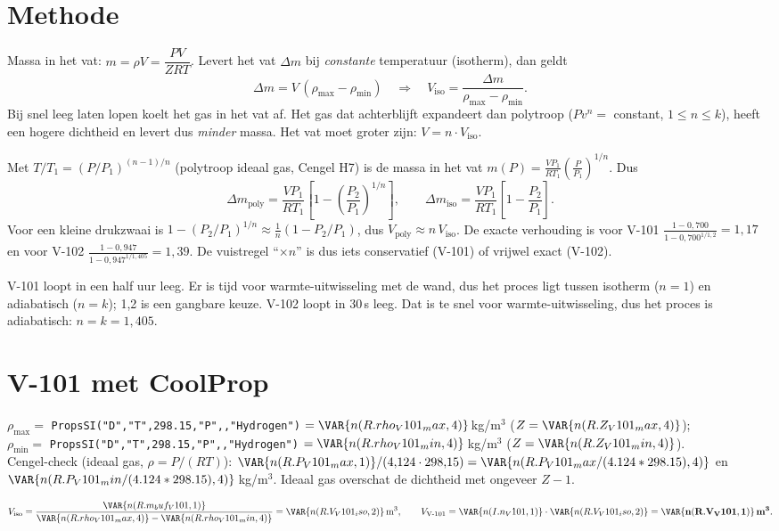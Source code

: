 \section{Methode}
\begin{methode}
Massa in het vat: $m = \rho V = \dfrac{P V}{Z R T}$. Levert het vat $\Delta m$ bij \emph{constante} temperatuur
(isotherm), dan geldt
\[
\Delta m = V\,(\rho_{\max}-\rho_{\min}) \quad\Rightarrow\quad V_\mathrm{iso} = \frac{\Delta m}{\rho_{\max}-\rho_{\min}}.
\]
Bij snel leeg laten lopen koelt het gas in het vat af. Het gas dat achterblijft expandeert dan polytroop
($P v^n = $ constant, $1 \le n \le k$), heeft een hogere dichtheid en levert dus \emph{minder} massa. Het vat moet
groter zijn: $V = n\cdot V_\mathrm{iso}$.
\end{methode}
Met $T/T_1 = (P/P_1)^{(n-1)/n}$ (polytroop ideaal gas, Cengel H7) is de massa in het vat
$m(P) = \frac{V P_1}{R T_1}\left(\frac{P}{P_1}\right)^{1/n}$. Dus
\[
\Delta m_\mathrm{poly} = \frac{V P_1}{R T_1}\left[1 - \left(\frac{P_2}{P_1}\right)^{1/n}\right],\qquad
\Delta m_\mathrm{iso} = \frac{V P_1}{R T_1}\left[1 - \frac{P_2}{P_1}\right].
\]
Voor een kleine drukzwaai is $1-(P_2/P_1)^{1/n} \approx \frac{1}{n}(1-P_2/P_1)$, dus $V_\mathrm{poly} \approx n\,V_\mathrm{iso}$.
De exacte verhouding is voor V-101 $\frac{1-0{,}700}{1-0{,}700^{1/1{,}2}} = 1{,}17$ en voor V-102
$\frac{1-0{,}947}{1-0{,}947^{1/1{,}405}} = 1{,}39$. De vuistregel ``$\times n$'' is dus iets conservatief (V-101)
of vrijwel exact (V-102).
\begin{waarom}[$n = 1{,}2$ voor V-101 en $n = k$ voor V-102]
V-101 loopt in een half uur leeg. Er is tijd voor warmte-uitwisseling met de wand, dus het proces ligt tussen
isotherm ($n=1$) en adiabatisch ($n=k$); 1,2 is een gangbare keuze. V-102 loopt in 30\,s leeg. Dat is te snel
voor warmte-uitwisseling, dus het proces is adiabatisch: $n = k = 1{,}405$.
\end{waarom}

\section{V-101 met CoolProp}
\begin{coolprop}
$\rho_{\max} = $ \texttt{PropsSI("D","T",298.15,"P",,"Hydrogen")} $= \VAR{n(R.rho_V101_max,4)}$\,kg/m$^3$
($Z = \VAR{n(R.Z_V101_max,4)}$);\\
$\rho_{\min} = $ \texttt{PropsSI("D","T",298.15,"P",,"Hydrogen")} $= \VAR{n(R.rho_V101_min,4)}$\,kg/m$^3$
($Z = \VAR{n(R.Z_V101_min,4)}$).\\
Cengel-check (ideaal gas, $\rho = P/(RT)$): $\VAR{n(R.P_V101_max,1)}/(4{,}124\cdot298{,}15) = \VAR{n(R.P_V101_max/(4.124*298.15),4)}$ en
$\VAR{n(R.P_V101_min/(4.124*298.15),4)}$\,kg/m$^3$. Ideaal gas overschat de dichtheid met ongeveer $Z-1$.
\end{coolprop}
\[
V_\mathrm{iso} = \frac{\VAR{n(R.m_buf_V101,1)}}{\VAR{n(R.rho_V101_max,4)} - \VAR{n(R.rho_V101_min,4)}} = \VAR{n(R.V_V101_iso,2)}\,\mathrm{m^3},\qquad
V_{\text{V-101}} = \VAR{n(I.n_V101,1)}\cdot\VAR{n(R.V_V101_iso,2)} = \mathbf{\VAR{n(R.V_V101,1)}\,m^3}.
\]
